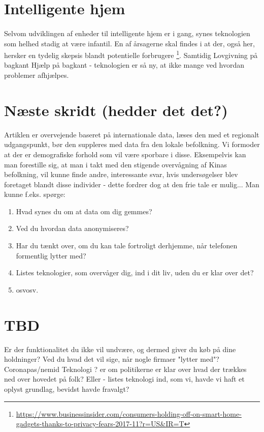 \documentclass{article}
\begin{document}
\section{Intelligente hjem}
\paragraph{}
Selvom udviklingen af enheder til intelligente hjem er i gang, synes teknologien som helhed stadig at være infantil.
En af årsagerne skal findes i at der, også her, hersker en tydelig skepsis blandt potentielle forbrugere \footnote{\url{https://www.businessinsider.com/consumers-holding-off-on-smart-home-gadgets-thanks-to-privacy-fears-2017-11?r=US\&IR=T}}.
Samtidig 
Lovgivning på bagkant
Hjælp på bagkant - teknologien er så ny, at ikke mange ved hvordan problemer afhjælpes.

\section{Næste skridt (hedder det det?)}
Artiklen er overvejende baseret på internationale data, læses den med et regionalt udgangspunkt, bør den suppleres med data fra den lokale befolkning. Vi formoder at der er demografiske forhold som vil være sporbare i disse. Eksempelvis kan man forestille sig, at man i takt med den stigende overvågning af Kinas befolkning, vil kunne finde andre, interessante svar, hvis undersøgelser blev foretaget blandt disse individer - dette fordrer dog at den frie tale er mulig... 
Man kunne f.eks. spørge:
\begin{enumerate}
    \item Hvad synes du om at data om dig gemmes?
    \item Ved du hvordan data anonymiseres?
    \item Har du tænkt over, om du kan tale fortroligt derhjemme, når telefonen formentlig lytter med?
    \item Listes teknologier, som overvåger dig, ind i dit liv, uden du er klar over det?
    \item osvosv.    
\end{enumerate}
\newpage
\section{TBD}
Er der funktionalitet du ikke vil undvære, og dermed giver du køb på dine holdninger?
Ved du hvad det vil sige, når nogle firmaer "lytter med"?
Coronapas/nemid
Teknologi
? er om politikerne er klar over hvad der trækkes ned over hovedet på folk?
Eller - listes teknologi ind, som vi, havde vi haft et oplyst grundlag, bevidst havde fravalgt?
\end{document}
